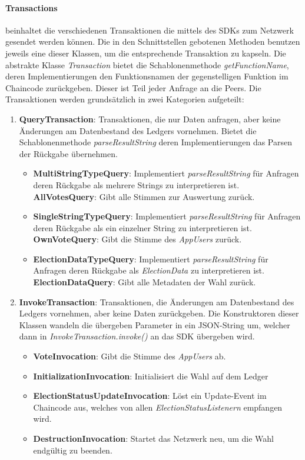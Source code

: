 \documentclass[parskip=full]{scrartcl}
\newcommand{\textitx}[1]{\mbox{\textit{#1}}}
\newcommand{\fakeparagraph}[1]{\textbf{#1}}
\begin{document}
	\paragraph{Transactions} beinhaltet die verschiedenen Transaktionen die mittels des SDKs zum Netzwerk gesendet werden können. Die in den Schnittstellen gebotenen Methoden benutzen jeweils eine dieser Klassen, um die entsprechende Transaktion zu kapseln. Die abstrakte Klasse \textit{Transaction} bietet die Schablonenmethode \textit{getFunctionName}, deren Implementierungen den Funktionsnamen der gegenstelligen Funktion im Chaincode zurückgeben. Dieser ist Teil jeder Anfrage an die Peers. Die Transaktionen werden grundsätzlich in zwei Kategorien aufgeteilt:
	\begin{enumerate}
			\item\fakeparagraph{QueryTransaction}: Transaktionen, die nur Daten anfragen, aber keine Änderungen am Datenbestand des Ledgers vornehmen. Bietet die Schablonenmethode \textit{parseResultString} deren Implementierungen das Parsen der Rückgabe übernehmen.
			\begin{itemize}
				\item \fakeparagraph{MultiStringTypeQuery}: Implementiert \textit{parseResultString} für Anfragen deren Rückgabe als mehrere Strings zu interpretieren ist.
				\subitem \fakeparagraph{AllVotesQuery}: Gibt alle Stimmen zur Auswertung zurück.
				\item \fakeparagraph{SingleStringTypeQuery}: Implementiert \textit{parseResultString} für Anfragen deren Rückgabe als ein einzelner String zu interpretieren ist.
				\subitem \fakeparagraph{OwnVoteQuery}: Gibt die Stimme des \textitx{AppUsers} zurück.
				\item \fakeparagraph{ElectionDataTypeQuery}: Implementiert \textit{parseResultString} für Anfragen deren Rückgabe als \textit{ElectionData} zu interpretieren ist.
				\subitem \fakeparagraph{ElectionDataQuery}: Gibt alle Metadaten der Wahl zurück.
			\end{itemize}
			\item \fakeparagraph{InvokeTransaction}: Transaktionen, die Änderungen am Datenbestand des Ledgers vornehmen, aber keine Daten zurückgeben. Die Konstruktoren dieser Klassen wandeln die übergeben Parameter in ein JSON-String um, welcher dann in \textitx{InvokeTransaction.invoke()} an das SDK übergeben wird.
			\begin{itemize}
				\item \fakeparagraph{VoteInvocation}: Gibt die Stimme des \textitx{AppUsers} ab.
				\item \fakeparagraph{InitializationInvocation}: Initialisiert die Wahl auf dem Ledger
				\item \fakeparagraph{ElectionStatusUpdateInvocation}: Löst ein Update-Event im Chaincode aus, welches von allen \textitx{ElectionStatusListenern} empfangen wird.
				\item \fakeparagraph{DestructionInvocation}: Startet das Netzwerk neu, um die Wahl endgültig zu beenden.
			\end{itemize}
	\end{enumerate}
\end{document}
